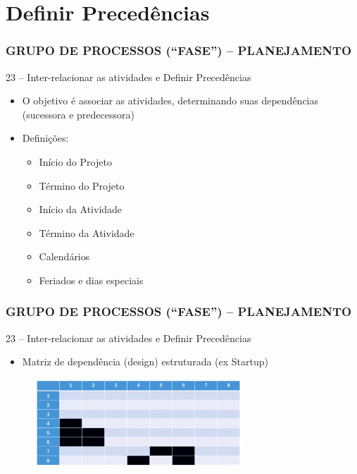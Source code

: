 \section{Definir Precedências}
\begin{frame}
 \frametitle{GRUPO DE PROCESSOS (“FASE”) – PLANEJAMENTO}
23 – Inter-relacionar as atividades e Definir Precedências
  \begin{itemize}
   \item O objetivo é associar as atividades, determinando suas dependências (sucessora e predecessora)
   \item Definições:
   \begin{itemize}
    \item Início do Projeto
    \item Término do Projeto
    \item Início da Atividade
    \item Término da Atividade
    \item Calendários
    \item Feriados e dias especiais
   \end{itemize}
  \end{itemize}
\end{frame}

\begin{frame}
 \frametitle{GRUPO DE PROCESSOS (“FASE”) – PLANEJAMENTO}
 23 – Inter-relacionar as atividades e Definir Precedências
 \begin{itemize}
  \item Matriz de dependência (design) estruturada (ex Startup)
 \end{itemize}
  \begin{figure}
   \centering
   \includegraphics[width = 0.7\textwidth]{figs/fig20.png}
  \end{figure}
\end{frame}


